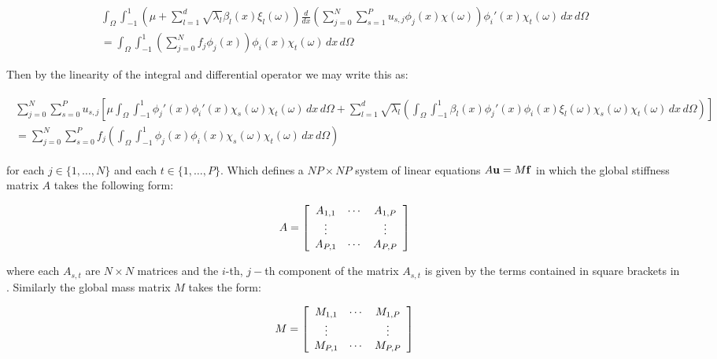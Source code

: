 \begin{align*}
    \int_{\Omega}\int_{-1}^1
      \left(\mu + \sum_{l=1}^d\sqrt{\lambda_l}\beta_l(x)\xi_l(\omega)\right)
      \frac{d}{dx}\left(\sum_{j=0}^N\sum_{s=1}^Pu_{s,j}\phi_j(x)\chi(\omega)\right)
      \phi_i'(x)\chi_t(\omega)\, dx\, d\Omega \\ =
    \int_{\Omega}\int_{-1}^1
      \left(\sum_{j=0}^Nf_j\phi_j(x)\right)
      \phi_i(x)\chi_t(\omega)\, dx\, d\Omega
\end{align*}

Then by the linearity of the integral and differential operator we may write
this as:

\begin{align}\label{eq:oned-stochastic-discrete}
  \begin{split}
      \sum_{j=0}^N\sum_{s=0}^Pu_{s,j}\left[
        \mu\int_\Omega\int_{-1}^1
          \phi_j'(x)\phi_i'(x)\chi_s(\omega)\chi_t(\omega)\, dx\, d\Omega +
          \sum_{l=1}^d\sqrt{\lambda_l}\left(\int_\Omega\int_{-1}^1
          \beta_l(x)\phi_j'(x)\phi_i(x)
      \xi_l(\omega)\chi_s(\omega)\chi_t(\omega)\, dx\, d\Omega\right)
      \right]\\ =
      \sum_{j=0}^N\sum_{s=0}^Pf_j\left(\int_\Omega\int_{-1}^1\phi_j(x)\phi_i(x)
      \chi_s(\omega)\chi_t(\omega)\, dx\, d\Omega\right)
  \end{split}
\end{align}

for each $j \in \{1,\ldots,N\}$ and each $t \in \{1,\ldots,P\}$. Which defines
a $NP \times NP$ system of linear equations $A\mathbf{u} = M\mathbf{f}$ in which the
global stiffness matrix $A$ takes the following form:

\begin{equation}
    A = \left[\begin{array}{c c c}
            A_{1,1} & \cdots & A_{1,P} \\
            \vdots & & \vdots \\
            A_{P,1} & \cdots & A_{P,P}
        \end{array}\right]
\end{equation}

where each $A_{s,t}$ are $N \times N$ matrices and the $i$-th, $j-$th component
of the matrix $A_{s,t}$ is given by the terms contained in square brackets in
. Similarly the global mass matrix $M$ takes
the form:

\begin{equation}
    M = \left[\begin{array}{c c c}
            M_{1,1} & \cdots & M_{1,P} \\
            \vdots & & \vdots \\
            M_{P,1} & \cdots & M_{P,P}
        \end{array}\right]
\end{equation}

